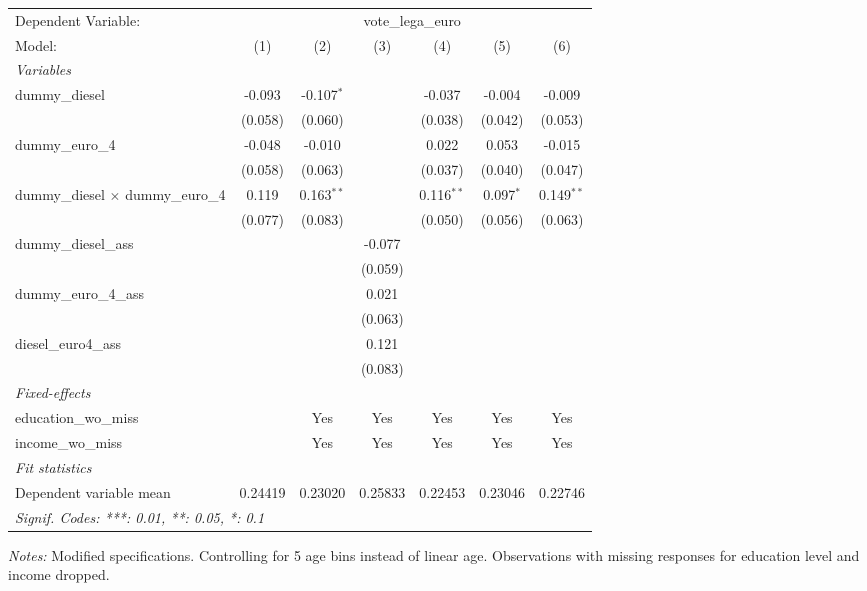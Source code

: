 
\begingroup
\centering
\begin{tabular}{lcccccc}
   \tabularnewline \midrule \midrule
   Dependent Variable: & \multicolumn{6}{c}{vote\_lega\_euro}\\
   Model:                                    & (1)     & (2)          & (3)     & (4)          & (5)         & (6)\\  
   \midrule
   \emph{Variables}\\
   dummy\_diesel                             & -0.093  & -0.107$^{*}$ &         & -0.037       & -0.004      & -0.009\\   
                                             & (0.058) & (0.060)      &         & (0.038)      & (0.042)     & (0.053)\\   
   dummy\_euro\_4                            & -0.048  & -0.010       &         & 0.022        & 0.053       & -0.015\\   
                                             & (0.058) & (0.063)      &         & (0.037)      & (0.040)     & (0.047)\\   
   dummy\_diesel $\times$ dummy\_euro\_4     & 0.119   & 0.163$^{**}$ &         & 0.116$^{**}$ & 0.097$^{*}$ & 0.149$^{**}$\\   
                                             & (0.077) & (0.083)      &         & (0.050)      & (0.056)     & (0.063)\\   
   dummy\_diesel\_ass                        &         &              & -0.077  &              &             &   \\   
                                             &         &              & (0.059) &              &             &   \\   
   dummy\_euro\_4\_ass                       &         &              & 0.021   &              &             &   \\   
                                             &         &              & (0.063) &              &             &   \\   
   diesel\_euro4\_ass                        &         &              & 0.121   &              &             &   \\   
                                             &         &              & (0.083) &              &             &   \\   
   \midrule
   \emph{Fixed-effects}\\
   education\_wo\_miss                       &         & Yes          & Yes     & Yes          & Yes         & Yes\\  
   income\_wo\_miss                          &         & Yes          & Yes     & Yes          & Yes         & Yes\\  
   \midrule
   \emph{Fit statistics}\\
   Dependent variable mean                   & 0.24419 & 0.23020      & 0.25833 & 0.22453      & 0.23046     & 0.22746\\  
   \midrule \midrule
   \multicolumn{7}{l}{\emph{Signif. Codes: ***: 0.01, **: 0.05, *: 0.1}}\\
\end{tabular}
 
\par \raggedright 
\textit{Notes:} Modified specifications. Controlling for 5 age bins instead of linear age. Observations with missing responses for education level and income dropped.
\par\endgroup


